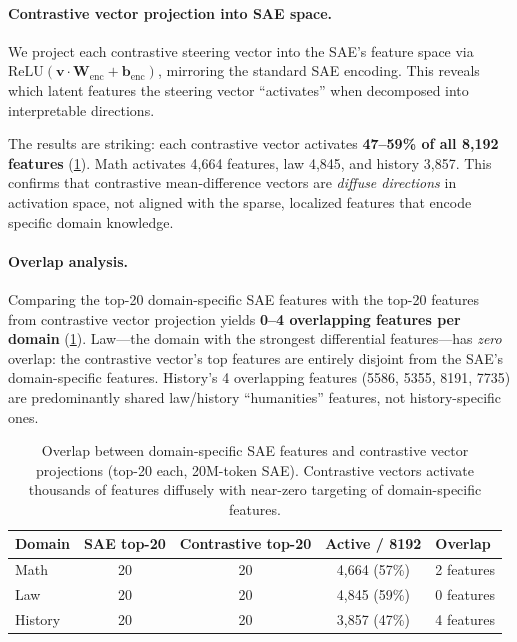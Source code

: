 \documentclass[11pt,a4paper]{article}
\begin{document}
\paragraph{Contrastive vector projection into SAE space.}
We project each contrastive steering vector into the SAE's feature space via $\text{ReLU}(\mathbf{v} \cdot \mathbf{W}_\text{enc} + \mathbf{b}_\text{enc})$, mirroring the standard SAE encoding. This reveals which latent features the steering vector ``activates'' when decomposed into interpretable directions.

The results are striking: each contrastive vector activates \textbf{47--59\% of all 8{,}192 features} (\cref{tab:sae_overlap}). Math activates 4{,}664 features, law 4{,}845, and history 3{,}857. This confirms that contrastive mean-difference vectors are \textit{diffuse directions} in activation space, not aligned with the sparse, localized features that encode specific domain knowledge.

\paragraph{Overlap analysis.}
Comparing the top-20 domain-specific SAE features with the top-20 features from contrastive vector projection yields \textbf{0--4 overlapping features per domain} (\cref{tab:sae_overlap}). Law---the domain with the strongest differential features---has \textit{zero} overlap: the contrastive vector's top features are entirely disjoint from the SAE's domain-specific features. History's 4 overlapping features (5586, 5355, 8191, 7735) are predominantly shared law/history ``humanities'' features, not history-specific ones.

\begin{table}[H]
\centering
\caption{Overlap between domain-specific SAE features and contrastive vector projections (top-20 each, 20M-token SAE). Contrastive vectors activate thousands of features diffusely with near-zero targeting of domain-specific features.}
\label{tab:sae_overlap}
\small
\begin{tabular}{lcccl}
\toprule
\textbf{Domain} & \textbf{SAE top-20} & \textbf{Contrastive top-20} & \textbf{Active / 8192} & \textbf{Overlap} \\
\midrule
Math    & 20 & 20 & 4{,}664 (57\%) & 2 features \\
Law     & 20 & 20 & 4{,}845 (59\%) & 0 features \\
History & 20 & 20 & 3{,}857 (47\%) & 4 features \\
\bottomrule
\end{tabular}
\end{table}
\end{document}

